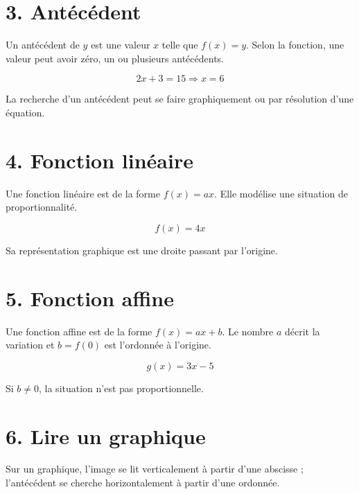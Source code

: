 
\section{3. Antécédent}
Un antécédent de $y$ est une valeur $x$ telle que $f(x)=y$. Selon la fonction, une valeur peut avoir zéro, un ou plusieurs antécédents.

\[
2x+3=15\Rightarrow x=6
\]

\begin{exemple}
La recherche d’un antécédent peut se faire graphiquement ou par résolution d’une équation.
\end{exemple}

\section{4. Fonction linéaire}
Une fonction linéaire est de la forme $f(x)=ax$. Elle modélise une situation de proportionnalité.

\[
f(x)=4x
\]

\begin{exemple}
Sa représentation graphique est une droite passant par l’origine.
\end{exemple}

\section{5. Fonction affine}
Une fonction affine est de la forme $f(x)=ax+b$. Le nombre $a$ décrit la variation et $b=f(0)$ est l’ordonnée à l’origine.

\[
g(x)=3x-5
\]

\begin{exemple}
Si $b\neq0$, la situation n’est pas proportionnelle.
\end{exemple}


\section{6. Lire un graphique}
Sur un graphique, l’image se lit verticalement à partir d’une abscisse ; l’antécédent se cherche horizontalement à partir d’une ordonnée.


